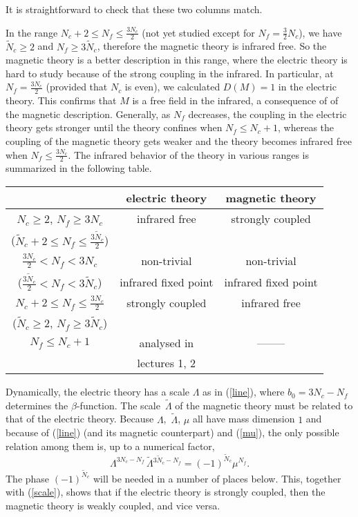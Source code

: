 \documentclass[lecture]{qft-l}
\newcommand{\Lam}{\varLambda}
\newcommand{\ND}{\tilde{N}_c}
\newcommand{\LamD}{\,\tilde{\!\Lam}{}}
\numberwithin{figure}{chapter}
\begin{document}
\bigskip\noindent
It is straightforward to check that these two columns match.

In the range $N_c+2\le N_f\le\frac{3N_c}{2}$ (not yet studied except for
$N_f=\frac{3}{2}N_c$), we have $\ND\ge2$ and $N_f\ge3\ND$,
therefore the magnetic theory is infrared free.
So the magnetic theory is a better description in this range, 
where the electric theory is hard to study 
because of the strong coupling in the infrared.
In particular, at $N_f=\frac{3N_c}{2}$ (provided that $N_c$ is even),
we calculated $D(M)=1$ in the electric theory.
This confirms that $M$ is a free field in the infrared,
a consequence of of the magnetic description.
Generally, as $N_f$ decreases, the coupling in the electric theory
gets stronger until the theory confines when $N_f\le N_c+1$,
whereas the coupling of the magnetic theory gets weaker
and the theory becomes infrared free when $N_f\le\frac{3N_c}{2}$.
The infrared behavior of the theory in various ranges is summarized in the 
following table.

\bigskip
\begin{center}
\renewcommand{\arraystretch}{1.3}
\begin{tabular}{c|c|c}
&   electric theory	&     magnetic theory	\\
\hline
$N_c\ge2$, $N_f\ge3N_c$	&   infrared free&     strongly coupled	\\
($\ND+2\le N_f\le\frac{3\ND}{2}$) & 	 &	\\
\hline	
$\frac{3N_c}{2}<N_f<3N_c$ &    non-trivial 	&non-trivial	\\
($\frac{3\ND}{2}<N_f<3\ND$)& 
infrared fixed point& infrared fixed point\\  
\hline
$N_c+2\le N_f\le\frac{3N_c}{2}$ & strongly coupled 
  & infrared free\\
($\ND\ge2$, $N_f\ge3\ND$) &	&\\
\hline
$N_f\le N_c+1$		& analysed in		&--------\\
			& lectures 1, 2		&
\end{tabular}
\end{center}


\bigskip
{}

Dynamically, the electric theory has a scale $\Lam$ as in (\ref{line}),
where $b_0=3N_c-N_f$ determines the $\beta$-function.
The scale $\LamD$ of the magnetic theory must be related to that of 
the electric theory.
Because $\Lam$, $\LamD$, $\mu$ all have mass dimension $1$ and because
of (\ref{line}) (and its magnetic counterpart) and (\ref{mu}), 
the only possible relation among them is, up to a numerical factor,
	\begin{equation}\label{scaleD}
\Lam^{3N_c-N_f}\LamD^{3\ND-N_f}=(-1)^{\ND}\mu^{N_f}.
	\end{equation}
The phase $(-1)^{\ND}$ will be needed in a number of places below.
This, together with (\ref{scale}), shows that if the electric theory
is strongly coupled, then the magnetic theory is weakly coupled, 
and vice versa.
\end{document}
